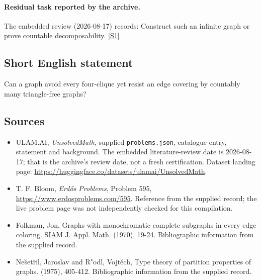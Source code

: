 \documentclass[11pt,a4paper]{article}
\newcommand{\sref}[2]{\hyperlink{source:#1:#2}{[S#2]}}
\begin{document}
\paragraph{Residual task reported by the archive.}

The embedded review (2026-08-17) records: Construct such an infinite graph or prove countable decomposability. \sref{statement}{1}

\subsection{Short English statement}

Can a graph avoid every four-clique yet resist an edge covering by countably many triangle-free graphs?

\subsection{Sources}

{\small

\begin{itemize}

\item[\hypertarget{source:statement:1}{S1}] ULAM.AI, \emph{UnsolvedMath}, supplied \texttt{problems.json}, catalogue entry, statement and background. The embedded literature-review date is 2026-08-17; that is the archive’s review date, not a fresh certification. Dataset landing page: \url{https://huggingface.co/datasets/ulamai/UnsolvedMath}.

\item[\hypertarget{source:statement:2}{S2}] T. F. Bloom, \emph{Erdős Problems}, Problem 595, \url{https://www.erdosproblems.com/595}. Reference from the supplied record; the live problem page was not independently checked for this compilation.

\item[\hypertarget{source:statement:3}{S3}] Folkman, Jon, Graphs with monochromatic complete subgraphs in every edge coloring. SIAM J. Appl. Math. (1970), 19-24. Bibliographic information from the supplied record.

\item[\hypertarget{source:statement:4}{S4}] Ne\u set\u ril, Jaroslav and R"odl, Vojt\v ech, Type theory of partition properties of graphs. (1975), 405-412. Bibliographic information from the supplied record.

\end{itemize}

}

\label{end:statement}
\end{document}

